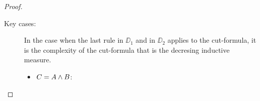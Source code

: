 \begin{proof}
\begin{description}
\begin{itemize}
\begin{smallequation*}\hspace*{-5.5em}
\reducesto
%	
\end{smallequation*}
                \end{itemize}
              \item[Key cases:]\label{key-cases}
                In the case when the last rule in $\DD_1$ and in $\DD_2$ applies to the cut-formula, it is the complexity of the cut-formula that is the decresing inductive measure.
                \begin{itemize}
				\item $C=A \mathbin{\wedge} B$:
				
				
				\begin{smallequation*}\hspace*{-7.5em}
					{
					}
					\reducesto
%				
					{
					}
				\end{smallequation*}
				

\end{itemize}
\end{description}
\end{proof}

